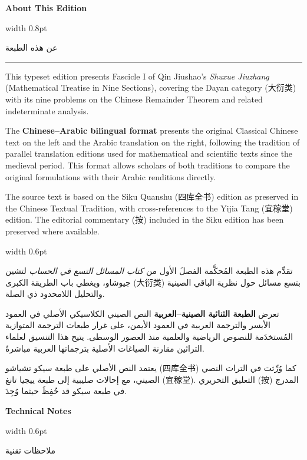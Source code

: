 \documentclass[11pt,a4paper]{article}
\newlength{\cnwidth}
\newlength{\arwidth}
\newcommand{\paralleltext}[2]{%
  \par\medskip\noindent
  \begin{minipage}[t]{\cnwidth}%
    \small #1%
  \end{minipage}%
  \hfill\textcolor{colrule}{\vrule width 0.6pt}\hfill
  \begin{minipage}[t]{\arwidth}%
    \small\arabicfont\beginR #2\endR%
  \end{minipage}%
  \par\medskip
}
\newcommand{\parallelsection}[2]{%
  \par\bigskip\noindent
  \begin{minipage}[t]{\cnwidth}%
    \Large\bfseries\color{sectioncolor} #1%
  \end{minipage}%
  \hfill\textcolor{colrule}{\vrule width 0.8pt}\hfill
  \begin{minipage}[t]{\arwidth}%
    \Large\arabicfontbf\color{sectioncolor}\beginR #2\endR%
  \end{minipage}%
  \par\medskip\noindent\textcolor{colrule}{\rule{\textwidth}{0.6pt}}\par\medskip
}
\newcommand{\parallelsubsection}[2]{%
  \par\medskip\noindent
  \begin{minipage}[t]{\cnwidth}%
    \large\bfseries\color{sectioncolor} #1%
  \end{minipage}%
  \hfill\textcolor{colrule}{\vrule width 0.6pt}\hfill
  \begin{minipage}[t]{\arwidth}%
    \large\arabicfontbf\color{sectioncolor}\beginR #2\endR%
  \end{minipage}%
  \par\smallskip
}
\begin{document}
\newpage

\parallelsection{About This Edition}{عن هذه الطبعة}

\paralleltext{%
This typeset edition presents Fascicle I of Qin Jiushao's \textit{Shuxue Jiuzhang} (Mathematical Treatise in Nine Sections), covering the Dayan category (大衍类) with its nine problems on the Chinese Remainder Theorem and related indeterminate analysis.

The \textbf{Chinese--Arabic bilingual format} presents the original Classical Chinese text on the left and the Arabic translation on the right, following the tradition of parallel translation editions used for mathematical and scientific texts since the medieval period. This format allows scholars of both traditions to compare the original formulations with their Arabic renditions directly.

The source text is based on the Siku Quanshu (四库全书) edition as preserved in the Chinese Textual Tradition, with cross-references to the Yijia Tang (宜稼堂) edition. The editorial commentary (按) included in the Siku edition has been preserved where available.%
}{%
تقدِّم هذه الطبعة المُحكَّمة الفصلَ الأول من \textit{كتاب المسائل التسع في الحساب} لتشين جيوشاو، ويغطي باب الطريقة الكبرى (大衍类) بتسع مسائل حول نظرية الباقي الصينية والتحليل اللامحدود ذي الصلة.

تعرض \textbf{الطبعة الثنائية الصينية--العربية} النص الصيني الكلاسيكي الأصلي في العمود الأيسر والترجمة العربية في العمود الأيمن، على غرار طبعات الترجمة المتوازية المُستخدَمة للنصوص الرياضية والعلمية منذ العصور الوسطى. يتيح هذا التنسيق لعلماء التراثين مقارنة الصياغات الأصلية بترجماتها العربية مباشرةً.

يعتمد النص الأصلي على طبعة سيكو تشياشو (四库全书) كما وُرِّثت في التراث النصي الصيني، مع إحالات صليبية إلى طبعة ييجيا تانغ (宜稼堂). التعليق التحريري (按) المدرج في طبعة سيكو قد حُفِظَ حيثما وُجِدَ.
}

\parallelsubsection{Technical Notes}{ملاحظات تقنية}
\end{document}
